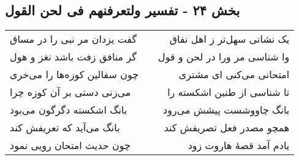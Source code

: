 \begin{center}
\section*{بخش ۲۴ - تفسیر ولتعرفنهم فی لحن القول}
\label{sec:sh024}
\begin{longtable}{l p{0.5cm} r}
گفت یزدان مر نبی را در مساق
&&
یک نشانی سهل‌تر ز اهل نفاق
\\
گر منافق زفت باشد نغز و هول
&&
وا شناسی مر ورا در لحن و قول
\\
چون سفالین کوزه‌ها را می‌خری
&&
امتحانی می‌کنی ای مشتری
\\
می‌زنی دستی بر آن کوزه چرا
&&
تا شناسی از طنین اشکسته را
\\
بانگ اشکسته دگرگون می‌بود
&&
بانگ چاووشست پیشش می‌رود
\\
بانگ می‌آید که تعریفش کند
&&
همچو مصدر فعل تصریفش کند
\\
چون حدیث امتحان رویی نمود
&&
یادم آمد قصهٔ هاروت زود
\\
\end{longtable}
\end{center}
